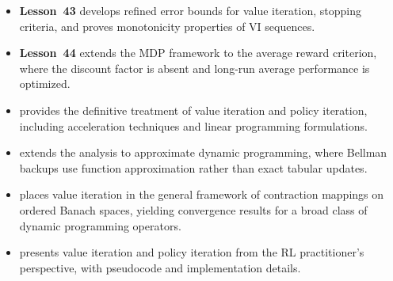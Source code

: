 \documentclass[11pt,a4paper]{article}
\begin{document}
\begin{itemize}
    \item \textbf{Lesson~43} develops refined error bounds for value
    iteration, stopping criteria, and proves monotonicity properties
    of VI sequences.
    \item \textbf{Lesson~44} extends the MDP framework to the average
    reward criterion, where the discount factor is absent and long-run
    average performance is optimized.
    \item \citet[Chapters 6--7]{puterman2014} provides the definitive
    treatment of value iteration and policy iteration, including
    acceleration techniques and linear programming formulations.
    \item \citet[Chapter 2]{bertsekas2012} extends the analysis to
    approximate dynamic programming, where Bellman backups use
    function approximation rather than exact tabular updates.
    \item \citet{denardo1967} places value iteration in the general
    framework of contraction mappings on ordered Banach spaces,
    yielding convergence results for a broad class of dynamic
    programming operators.
    \item \citet[Chapter 4]{suttonbarto2018} presents value iteration
    and policy iteration from the RL practitioner's perspective, with
    pseudocode and implementation details.
\end{itemize}


\end{document}
